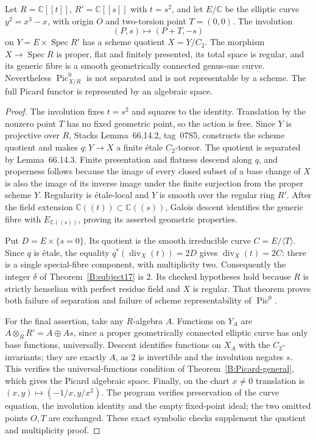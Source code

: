 \begin{proposition}\label{B:Picard-double-fibre}
Let $R=\mathbb C[[t]]$, $R'=\mathbb C[[s]]$ with $t=s^2$, and let $E/\mathbb C$ be the elliptic curve $y^2=x^3-x$, with origin $O$ and two-torsion point $T=(0,0)$. The involution
\[
 (P,s)\longmapsto(P+T,-s)
\]
on $Y=E\times\operatorname{Spec}R'$ has a scheme quotient $X=Y/C_2$. The morphism $X\to\operatorname{Spec}R$ is proper, flat and finitely presented, its total space is regular, and its generic fibre is a smooth geometrically connected genus-one curve. Nevertheless $\operatorname{Pic}^0_{X/R}$ is not separated and is not representable by a scheme. The full Picard functor is represented by an algebraic space.
\end{proposition}
\begin{proof}
The involution fixes $t=s^2$ and squares to the identity. Translation by the nonzero point $T$ has no fixed geometric point, so the action is free. Since $Y$ is projective over $R$, Stacks Lemma~66.14.2, tag~07S5, constructs the scheme quotient and makes $q:Y\to X$ a finite \'etale $C_2$-torsor. The quotient is separated by Lemma~66.14.3. Finite presentation and flatness descend along $q$, and properness follows because the image of every closed subset of a base change of $X$ is also the image of its inverse image under the finite surjection from the proper scheme $Y$. Regularity is \'etale-local and $Y$ is smooth over the regular ring $R'$. After the field extension $\mathbb C((t))\subset\mathbb C((s))$, Galois descent identifies the generic fibre with $E_{\mathbb C((s))}$, proving its asserted geometric properties.

Put $D=E\times\{s=0\}$. Its quotient is the smooth irreducible curve $C=E/\langle T\rangle$. Since $q$ is \'etale, the equality $q^*(\operatorname{div}_X(t))=2D$ gives $\operatorname{div}_X(t)=2C$: there is a single special-fibre component, with multiplicity two. Consequently the integer $\delta$ of Theorem~\ref{B:subject17} is $2$. Its checked hypotheses hold because $R$ is strictly henselian with perfect residue field and $X$ is regular. That theorem proves both failure of separation and failure of scheme representability of $\operatorname{Pic}^0$.

For the final assertion, take any $R$-algebra $A$. Functions on $Y_A$ are $A\otimes_R R'=A\oplus As$, since a proper geometrically connected elliptic curve has only base functions, universally. Descent identifies functions on $X_A$ with the $C_2$-invariants; they are exactly $A$, as $2$ is invertible and the involution negates $s$. This verifies the universal-functions condition of Theorem~\ref{B:Picard-general}, which gives the Picard algebraic space. Finally, on the chart $x\ne0$ translation is $(x,y)\mapsto(-1/x,y/x^2)$. The program verifies preservation of the curve equation, the involution identity and the empty fixed-point ideal; the two omitted points $O,T$ are exchanged. These exact symbolic checks supplement the quotient and multiplicity proof.
\end{proof}

